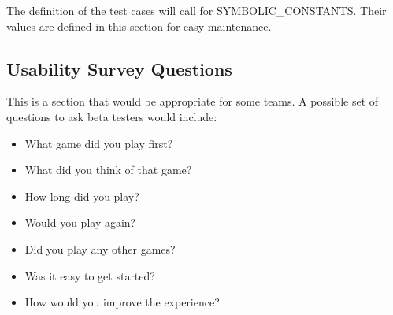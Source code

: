 \documentclass[12pt, titlepage]{article}
\begin{document}
The definition of the test cases will call for SYMBOLIC\_CONSTANTS.
Their values are defined in this section for easy maintenance.

\subsection{Usability Survey Questions}

This is a section that would be appropriate for some teams.
A possible set of questions to ask beta testers would include:
\begin{itemize}
    \item What game did you play first?
    \item What did you think of that game?
    \item How long did you play?
    \item Would you play again?
    \item Did you play any other games?
    \item Was it easy to get started?
    \item How would you improve the experience?
\end{itemize}
\end{document}
